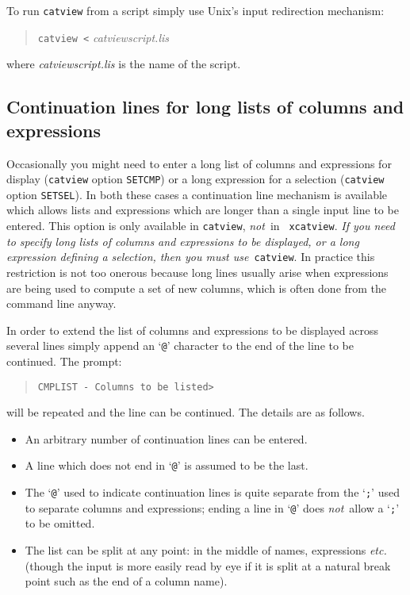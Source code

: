 \documentclass[twoside,11pt]{article}
\renewcommand{\_}{\texttt{\symbol{95}}}
\begin{document}
To run {\tt catview} from a script simply use Unix's input redirection
mechanism:

\begin{verse}
{\tt catview <} {\it catview\_script.lis}
\end{verse}

where {\it catview\_script.lis}\/ is the name of the script.

\subsection{\label{LONGLINE}Continuation lines for long lists of
columns and expressions}

Occasionally you might need to enter a long list of columns and
expressions for display ({\tt catview} option {\tt SETCMP}) or a long
expression for a selection ({\tt catview} option {\tt SETSEL}).  In both
these cases a continuation line mechanism is available which allows lists
and expressions which are longer than a single input line to be entered.
This option is only available in {\tt catview}, {\it not}\, in {\tt
xcatview}.  {\it If you need to specify long lists of columns and
expressions to be displayed, or a long expression defining a selection,
then you must use}\, {\tt catview}.  In practice this restriction is not
too onerous because long lines usually arise when expressions are being
used to compute a set of new columns, which is often done from the command
line anyway.

In order to extend the list of columns and expressions to be displayed
across several lines simply append an `{\tt @}' character to the end of
the line to be continued. The prompt:

\begin{quote}
\verb+CMPLIST - Columns to be listed>+
\end{quote}

will be repeated and the line can be continued.  The details are as
follows.

\begin{itemize}

  \item An arbitrary number of continuation lines can be entered.

  \item A line which does not end in `{\tt @}' is assumed to be the last.

  \item The `{\tt @}' used to indicate continuation lines is quite separate
   from the `{\tt ;}' used to separate columns and expressions; ending a
   line in `{\tt @}' does {\it not}\, allow a `{\tt ;}' to be omitted.

  \item The list can be split at any point: in the middle of names,
   expressions \emph{etc.} (though the input is more easily read by eye if
   it is split at a natural break point such as the end of a column name).

\end{itemize}
\end{document}
